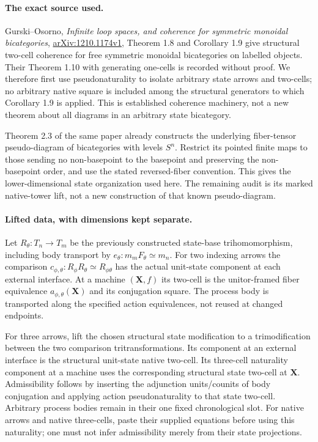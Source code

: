 \documentclass{article}
\begin{document}
\paragraph{The exact source used.} Gurski--Osorno, \emph{Infinite loop spaces, and coherence for symmetric monoidal bicategories}, \href{https://arxiv.org/pdf/1210.1174v1}{arXiv:1210.1174v1}, Theorem 1.8 and Corollary 1.9 give structural two-cell coherence for free symmetric monoidal bicategories on labelled objects. Their Theorem 1.10 with generating one-cells is recorded without proof. We therefore first use pseudonaturality to isolate arbitrary state arrows and two-cells; no arbitrary native square is included among the structural generators to which Corollary 1.9 is applied. This is established coherence machinery, not a new theorem about all diagrams in an arbitrary state bicategory.

Theorem 2.3 of the same paper already constructs the underlying fiber-tensor pseudo-diagram of bicategories with levels $S^n$. Restrict its pointed finite maps to those sending no non-basepoint to the basepoint and preserving the non-basepoint order, and use the stated reversed-fiber convention. This gives the lower-dimensional state organization used here. The remaining audit is its marked native-tower lift, not a new construction of that known pseudo-diagram.

\paragraph{Lifted data, with dimensions kept separate.} Let $R_\theta:T_n\to T_m$ be the previously constructed state-base trihomomorphism, including body transport by $e_\theta:m_mF_\theta\simeq m_n$. For two indexing arrows the comparison $c_{\phi,\theta}:R_\phi R_\theta\simeq R_{\phi\theta}$ has the actual unit-state component at each external interface. At a machine $(\mathbf X,f)$ its two-cell is the unitor-framed fiber equivalence $a_{\phi,\theta}(\mathbf X)$ and its conjugation square. The process body is transported along the specified action equivalences, not reused at changed endpoints.

For three arrows, lift the chosen structural state modification to a trimodification between the two comparison tritransformations. Its component at an external interface is the structural unit-state native two-cell. Its three-cell naturality component at a machine uses the corresponding structural state two-cell at $\mathbf X$. Admissibility follows by inserting the adjunction units/counits of body conjugation and applying action pseudonaturality to that state two-cell. Arbitrary process bodies remain in their one fixed chronological slot. For native arrows and native three-cells, paste their supplied equations before using this naturality; one must not infer admissibility merely from their state projections.
\end{document}
